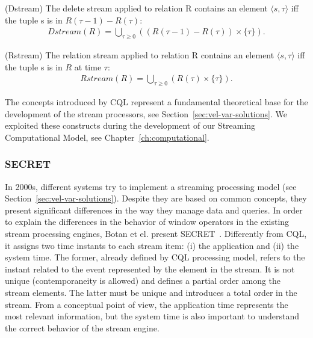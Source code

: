 \begin{Definition}
(Dstream) The delete stream applied to relation R contains an element $\langle s,\tau \rangle$ iff the tuple s is in $R(\tau - 1) - R(\tau)$: 
\noindent\begin{align*}
Dstream(R) = \bigcup_{\tau \geq 0} ((R(\tau - 1) - R(\tau)) \times \{\tau\}).
\end{align*} 
\end{Definition}

\begin{Definition}
(Rstream) The relation stream applied to relation R contains an element $\langle s,\tau \rangle$ iff the tuple s is in $R$ at time $\tau$: 
\noindent\begin{align*}
Rstream(R) = \bigcup_{\tau \geq 0} (R(\tau) \times \{\tau\}).
\end{align*} 
\end{Definition}

The concepts introduced by CQL represent a fundamental theoretical base for the development of the stream processors, see Section~\ref{sec:vel-var-solutions}. We exploited these constructs during the development of our Streaming Computational Model, see Chapter~\ref{ch:computational}.  

\subsubsection{SECRET}\label{sec:secret}
In 2000s, different systems try to implement a streaming processing model (see Section~\ref{sec:vel-var-solutions}). Despite they are based on common concepts, they present significant differences in the way they manage data and queries.
In order to explain the differences in the behavior of window operators in the existing stream processing engines, Botan et el. present SECRET~\cite{DBLP:journals/pvldb/BotanDDHMT10}.
Differently from CQL, it assigns two time instants to each stream item: (i) the application and (ii) the system time. The former, already defined by CQL processing model, refers to the instant related to the event represented by the element in the stream. It is not unique (contemporaneity is allowed) and defines a partial order among the stream elements. The latter must be unique and introduces a total order in the stream. From a conceptual point of view, the application time represents the most relevant information, but the system time is also important to understand the correct behavior of the stream engine.

